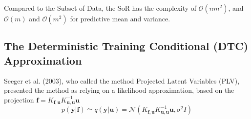 \documentclass[10pt]{elegantbook}
\begin{document}
Compared to the Subset of Data, the SoR has the complexity of $\mathcal O(nm^2)$, and $\mathcal O(m)$ and $\mathcal O(m^2)$ for predictive mean and variance.

\subsection{The Deterministic Training Conditional (DTC) Approximation}
Seeger et al. (2003), who called the method Projected
Latent Variables (PLV), presented the method as relying on a likelihood approximation, based on
the projection $\mathbf f = K_{\mathbf f, \mathbf u} K_{\mathbf u, \mathbf u}^{-1} \mathbf u$
\begin{equation}
    p(\mathbf y | \mathbf f) \simeq q(\mathbf y | \mathbf u) = \mathcal N \left ( 
        K_{\mathbf f, \mathbf u} K_{\mathbf u, \mathbf u}^{-1} \mathbf u, \sigma^2 I
         \right )
\end{equation}
\end{document}
